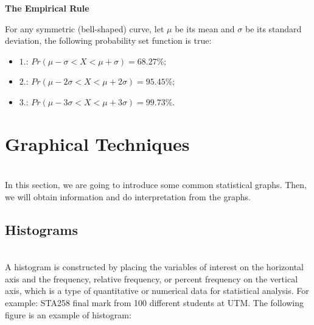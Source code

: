 \noindent
\textbf{The Empirical Rule}
\begin{definition}
  For any symmetric (bell-shaped) curve, let $\mu$ be its mean and $\sigma$ be its standard deviation, the following probability set function is true:
   \begin{itemize}
    \item  $1.$: $Pr(\mu - \sigma < X < \mu + \sigma) = 68.27\%;$
    \item  $2.$: $Pr(\mu - 2\sigma < X < \mu + 2\sigma) = 95.45\%;$
    \item  $3.$: $Pr(\mu - 3\sigma < X < \mu + 3\sigma) = 99.73\%.$
   \end{itemize}
  \end{definition}

\section{Graphical Techniques}\\

\noindent
In this section, we are going to introduce some common statistical graphs. Then, we will obtain information and do interpretation from the graphs.

\subsection{Histograms}\\

\noindent
A histogram is constructed by placing the variables of interest on the horizontal axis and the frequency, relative frequency, or percent frequency on the vertical axis, which is a type of quantitative or numerical data for statistical analysis. For example: STA258 final mark from 100 different students at UTM. The following figure is an example of histogram: 

